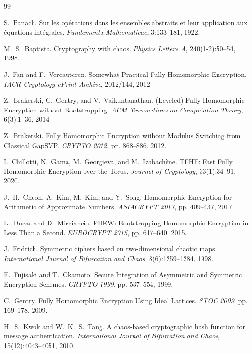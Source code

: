 \documentclass[11pt,a4paper]{article}
\begin{document}
\begin{thebibliography}{99}

S.~Banach.
\newblock Sur les opérations dans les ensembles abstraits et leur application aux équations intégrales.
\newblock \emph{Fundamenta Mathematicae}, 3:133--181, 1922.

M.~S.~Baptista.
\newblock Cryptography with chaos.
\newblock \emph{Physics Letters A}, 240(1-2):50--54, 1998.

J.~Fan and F.~Vercauteren.
\newblock Somewhat Practical Fully Homomorphic Encryption.
\newblock \emph{IACR Cryptology ePrint Archive}, 2012/144, 2012.

Z.~Brakerski, C.~Gentry, and V.~Vaikuntanathan.
\newblock (Leveled) Fully Homomorphic Encryption without Bootstrapping.
\newblock \emph{ACM Transactions on Computation Theory}, 6(3):1--36, 2014.

Z.~Brakerski.
\newblock Fully Homomorphic Encryption without Modulus Switching from Classical GapSVP.
\newblock \emph{CRYPTO 2012}, pp. 868--886, 2012.

I.~Chillotti, N.~Gama, M.~Georgieva, and M.~Izabachène.
\newblock TFHE: Fast Fully Homomorphic Encryption over the Torus.
\newblock \emph{Journal of Cryptology}, 33(1):34--91, 2020.

J.~H.~Cheon, A.~Kim, M.~Kim, and Y.~Song.
\newblock Homomorphic Encryption for Arithmetic of Approximate Numbers.
\newblock \emph{ASIACRYPT 2017}, pp. 409--437, 2017.

L.~Ducas and D.~Micciancio.
\newblock FHEW: Bootstrapping Homomorphic Encryption in Less Than a Second.
\newblock \emph{EUROCRYPT 2015}, pp. 617--640, 2015.

J.~Fridrich.
\newblock Symmetric ciphers based on two-dimensional chaotic maps.
\newblock \emph{International Journal of Bifurcation and Chaos}, 8(6):1259--1284, 1998.

E.~Fujisaki and T.~Okamoto.
\newblock Secure Integration of Asymmetric and Symmetric Encryption Schemes.
\newblock \emph{CRYPTO 1999}, pp. 537--554, 1999.

C.~Gentry.
\newblock Fully Homomorphic Encryption Using Ideal Lattices.
\newblock \emph{STOC 2009}, pp. 169--178, 2009.

H.~S.~Kwok and W.~K.~S.~Tang.
\newblock A chaos-based cryptographic hash function for message authentication.
\newblock \emph{International Journal of Bifurcation and Chaos}, 15(12):4043--4051, 2010.


\end{thebibliography}
\end{document}
